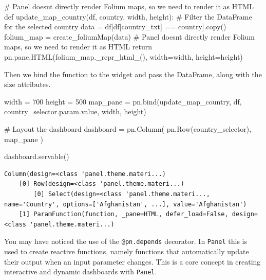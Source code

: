 \documentclass[
  letterpaper,
  DIV=11,
  numbers=noendperiod]{scrreprt}
\newenvironment{Shaded}{\begin{snugshade}}{\end{snugshade}}
\newcommand{\CommentTok}[1]{\textcolor[rgb]{0.37,0.37,0.37}{#1}}
\newcommand{\ControlFlowTok}[1]{\textcolor[rgb]{0.00,0.23,0.31}{#1}}
\newcommand{\DecValTok}[1]{\textcolor[rgb]{0.68,0.00,0.00}{#1}}
\newcommand{\KeywordTok}[1]{\textcolor[rgb]{0.00,0.23,0.31}{#1}}
\newcommand{\NormalTok}[1]{\textcolor[rgb]{0.00,0.23,0.31}{#1}}
\newcommand{\OperatorTok}[1]{\textcolor[rgb]{0.37,0.37,0.37}{#1}}
\newcommand{\StringTok}[1]{\textcolor[rgb]{0.13,0.47,0.30}{#1}}
\begin{document}
\begin{Shaded}
\begin{Highlighting}[]
\CommentTok{\# Panel doesn\textquotesingle{}t directly render Folium maps, so we need to render it as HTML}
\KeywordTok{def}\NormalTok{ update\_map\_country(df, country, width, height):}
    \CommentTok{\# Filter the DataFrame for the selected country}
\NormalTok{    data }\OperatorTok{=}\NormalTok{ df[df[}\StringTok{\textquotesingle{}country\_txt\textquotesingle{}}\NormalTok{] }\OperatorTok{==}\NormalTok{ country].copy()}
\NormalTok{    folium\_map }\OperatorTok{=}\NormalTok{ create\_foliumMap(data)}
    \CommentTok{\# Panel doesn\textquotesingle{}t directly render Folium maps, so we need to render it as HTML}
    \ControlFlowTok{return}\NormalTok{ pn.pane.HTML(folium\_map.\_repr\_html\_(), width}\OperatorTok{=}\NormalTok{width, height}\OperatorTok{=}\NormalTok{height)}
\end{Highlighting}
\end{Shaded}

Then we bind the function to the widget and pass the DataFrame, along
with the size attributes.

\begin{Shaded}
\begin{Highlighting}[]
\NormalTok{width }\OperatorTok{=} \DecValTok{700}
\NormalTok{height }\OperatorTok{=} \DecValTok{500}
\NormalTok{map\_pane }\OperatorTok{=}\NormalTok{ pn.bind(update\_map\_country, df,  country\_selector.param.value, width, height)}

\CommentTok{\# Layout the dashboard}
\NormalTok{dashboard }\OperatorTok{=}\NormalTok{ pn.Column(}
\NormalTok{    pn.Row(country\_selector),}
\NormalTok{    map\_pane}
\NormalTok{)}

\NormalTok{dashboard.servable()}
\end{Highlighting}
\end{Shaded}

\begin{verbatim}
Column(design=<class 'panel.theme.materi...)
    [0] Row(design=<class 'panel.theme.materi...)
        [0] Select(design=<class 'panel.theme.materi..., name='Country', options=['Afghanistan', ...], value='Afghanistan')
    [1] ParamFunction(function, _pane=HTML, defer_load=False, design=<class 'panel.theme.materi...)
\end{verbatim}

You may have noticed the use of the \texttt{@pn.depends} decorator. In
\texttt{Panel} this is used to create reactive functions, namely
functions that automatically update their output when an input parameter
changes. This is a core concept in creating interactive and dynamic
dashboards with \texttt{Panel}.
\end{document}
